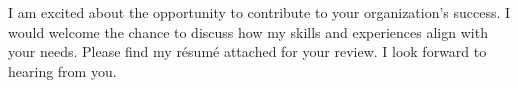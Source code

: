 \documentclass[11pt, a4paper]{./latex/awesome-cv}
\begin{document}
\begin{cvletter}
I am excited about the opportunity to contribute to your organization’s success. I would welcome the chance to discuss how my skills and experiences align with your needs. Please find my résumé attached for your review. I look forward to hearing from you.

\end{cvletter}

\makeletterclosing
\end{document}
